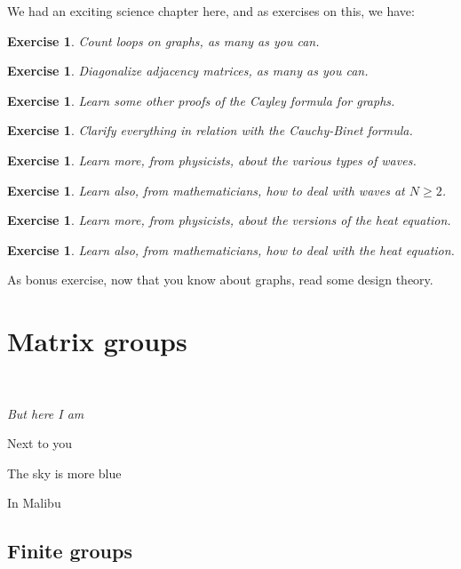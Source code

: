 \documentclass[12pt]{amsbook}
\newtheorem{exercise}[theorem]{Exercise}
\begin{document}
We had an exciting science chapter here, and as exercises on this, we have:

\begin{exercise}
Count loops on graphs, as many as you can.
\end{exercise}

\begin{exercise}
Diagonalize adjacency matrices, as many as you can.
\end{exercise}

\begin{exercise}
Learn some other proofs of the Cayley formula for graphs.
\end{exercise}

\begin{exercise}
Clarify everything in relation with the Cauchy-Binet formula.
\end{exercise}

\begin{exercise}
Learn more, from physicists, about the various types of waves.
\end{exercise}

\begin{exercise}
Learn also, from mathematicians, how to deal with waves at $N\geq2$.
\end{exercise}

\begin{exercise}
Learn more, from physicists, about the versions of the heat equation.
\end{exercise}

\begin{exercise}
Learn also, from mathematicians, how to deal with the heat equation.
\end{exercise}

As bonus exercise, now that you know about graphs, read some design theory.

\part{Matrix groups}

\ \vskip50mm

\begin{center}
{\em But here I am

Next to you

The sky is more blue

In Malibu}
\end{center}

\chapter{Finite groups}
\end{document}
